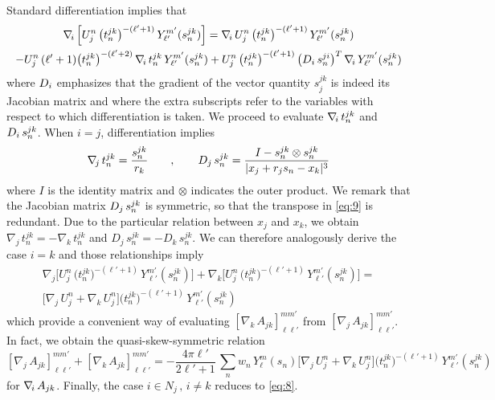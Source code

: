 Standard differentiation implies that
\begin{multline}\label{eq:9}
\nabla_{\!i}\, \Big[ U_j^n  \,  \big( t_n^{jk}\big)^{-(\ell'+1)} \, Y_{\ell'}^{m'} (s_n^{jk}) \Big] = \nabla_{\!i}\, U_j^n  \,  \big( t_n^{jk}\big)^{-(\ell'+1)} \, Y_{\ell'}^{m'} (s_n^{jk}) \\
- U_j^n  \, (\ell' + 1)  \big( t_n^{jk}\big)^{-(\ell'+2)} \, \nabla_{\!i}\, t_n^{jk} \, Y_{\ell'}^{m'} (s_n^{jk}) + U_j^n  \,  \big( t_n^{jk}\big)^{-(\ell'+1)} \, \big( D_i\, s_n^{ji} \big)^T\, \nabla_{\!i}\, Y_{\ell'}^{m'} (s_n^{jk})
\end{multline}
where $D_i$ emphasizes that the gradient of the vector quantity $s_j^{jk}$ is indeed its Jacobian matrix and where the extra subscripts refer to the variables with respect to which differentiation is taken. We proceed to evaluate $\nabla_{\!i}\, t_n^{jk}$ and $ D_i \, s_n^{jk}$. When $i = j$, differentiation implies
\[
\nabla_{\!j}\, t_n^{jk} = \frac{s_n^{jk}}{r_k} \qquad , \qquad D_j \, s_n^{jk} = \frac{I - s_n^{jk} \otimes s_n^{jk} }{|x_j + r_j s_n - x_k|^3}
\]
where $I$ is the identity matrix and $\otimes$ indicates the outer product. We remark that the Jacobian matrix $D_j \, s_n^{jk}$ is symmetric, so that the transpose in \eqref{eq:9} is redundant. 
Due to the particular relation between $x_j$ and $x_k$, we obtain $\nabla_{\! j} \, t_n^{jk} = - \nabla_{\! k} \, t_n^{jk}$ and $D_j \, s_n^{jk} = - D_k \, s_n^{jk}$.
We can therefore analogously derive the case $i = k$ and those relationships imply
\begin{multline*}
\nabla_{\! j} \Big[ U_j^n  \,  \big( t_n^{jk}\big)^{-(\ell'+1)} \, Y_{\ell'}^{m'} (s_n^{jk}) \Big] + \nabla_{\! k} \Big[ U_j^n  \,  \big( t_n^{jk}\big)^{-(\ell'+1)} \, Y_{\ell'}^{m'} (s_n^{jk}) \Big] = \\
  \Big[ \nabla_{\! j} \, U_j^n + \nabla_{\! k} \, U_j^n  \Big]  \big( t_n^{jk}\big)^{-(\ell'+1)} \, Y_{\ell'}^{m'} (s_n^{jk})
\end{multline*}
which provide a convenient way of evaluating $[\nabla_{\! k} \, A_{jk}]_{\ell \ell'}^{m m'}$ from $[\nabla_{\! j} \, A_{jk}]_{\ell \ell'}^{m m'}$. In fact, we obtain the quasi-skew-symmetric relation
\[
[ \nabla_{\! j} \, A_{jk}]_{\ell \ell'}^{m m'} + [\nabla_{\! k} \, A_{jk}]_{\ell \ell'}^{m m'} = -  \frac{4 \pi \ell'}{2 \ell'+1} \, \sum_{n} w_n\, Y_\ell^m(s_n) \Big[ \nabla_{\! j} \, U_j^n + \nabla_{\! k} \, U_j^n  \Big]  \big( t_n^{jk}\big)^{-(\ell'+1)} \, Y_{\ell'}^{m'} (s_n^{jk})
\]
for $\nabla_{\!i}\, A_{jk}$. Finally, the case $i \in N_j \, , \, i \not= k$ reduces to \eqref{eq:8}.

